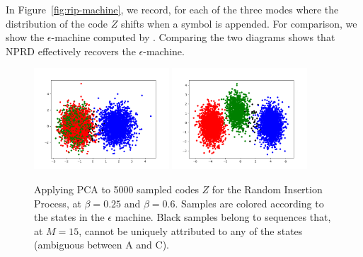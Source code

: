\documentclass[11pt,letterpaper]{article}
\newif \ifcomment
\newcommand\rljf[1]{\ifcomment{{\color{blue}(#1)}}\else{}\fi}
\begin{document}
In Figure~\ref{fig:rip-machine}, we record, for each of the three modes where the distribution of the code $Z$ shifts when a symbol is appended.
For comparison, we show the $\epsilon$-machine computed by \cite{marzen-predictive-2016}.
Comparing the two diagrams shows that NPRD effectively recovers the $\epsilon$-machine. \rljf{More detail on this part: it's a bit telegraphic}%

\begin{figure}
\includegraphics[width=0.45\textwidth]{code/figures/foo_pca_2.png}
\includegraphics[width=0.45\textwidth]{code/figures/foo_pca_3.png}
	\caption{Applying PCA to 5000 sampled codes $Z$ for the Random Insertion Process, at $\beta = 0.25$ and $\beta = 0.6$. Samples are colored according to the states in the $\epsilon$ machine. Black samples belong to sequences that, at $M=15$, cannot be uniquely attributed to any of the states (ambiguous between A and C).}\label{fig:latent}
\end{figure}
\end{document}
